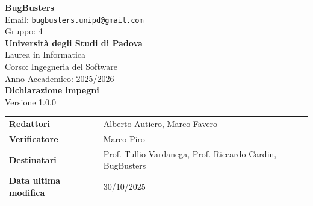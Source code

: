 \documentclass[a4paper,11pt]{article}
\newcommand{\CurrentVersion}{1.0.0}
\begin{document}
\begin{center}  
  
  {\Large\bfseries\color{primaryblue} BugBusters}\\[0.3cm]
  {\small\color{darkgray} Email: \texttt{bugbusters.unipd@gmail.com}} \\[0.1cm]
  {\small\color{darkgray} Gruppo: 4} \\[0.5cm]

  {\large\bfseries Università degli Studi di Padova}\\[0.3cm]
  {\small Laurea in Informatica}\\[0.2cm]
  {\small Corso: Ingegneria del Software}\\[0.2cm]
  {\small Anno Accademico: 2025/2026}\\[0.8cm]

  {\Huge\bfseries\color{primaryblue} Dichiarazione impegni}\\[0.3cm]
  {\Large Versione \CurrentVersion}\\[0.8cm]
\end{center}

\begin{center}
\begin{tcolorbox}[colback=lightgray,colframe=primaryblue,width=0.85\textwidth,arc=3mm,boxrule=0.5pt]
\begin{tabularx}{\linewidth}{@{}lX@{}}
\textbf{Redattori}  & Alberto Autiero, Marco Favero\\
\textbf{Verificatore} & Marco Piro \\
\textbf{Destinatari} & Prof. Tullio Vardanega, Prof. Riccardo Cardin, BugBusters \\
\textbf{Data ultima modifica}     & 30/10/2025 \\
\end{tabularx}
\end{tcolorbox}
\end{center}
\end{document}
